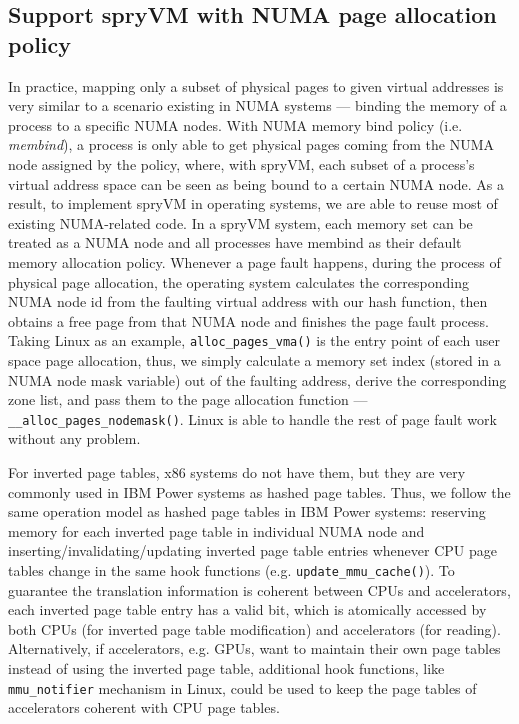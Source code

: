 \subsection{Support spryVM with NUMA page allocation policy}
In practice,  mapping only a subset of physical pages to given virtual addresses is very similar to a scenario existing in NUMA systems — binding the memory of a process to a specific NUMA nodes. With NUMA memory bind policy (i.e. \textit{membind}), a process is only able to get physical pages coming from the NUMA node assigned by the policy, where, with spryVM, each subset of a process’s virtual address space can be seen as being bound to a certain NUMA node. As a result, to implement spryVM in operating systems, we are able to reuse most of existing NUMA-related code. In a spryVM system, each memory set can be treated as a NUMA node and all processes have membind as their default memory allocation policy. Whenever a page fault happens, during the process of physical page allocation, the operating system calculates the corresponding NUMA node id from the faulting virtual address with our hash function, then obtains a free page from that NUMA node and finishes the page fault process. Taking Linux as an example, \verb|alloc_pages_vma()| is the entry point of each user space  page allocation, thus, we simply calculate a memory set index (stored in a NUMA node mask variable) out of the faulting address, derive the corresponding zone list, and pass them to the page allocation function — \verb|__alloc_pages_nodemask()|. Linux is able to handle the rest of page fault work without any problem.

For inverted page tables, x86 systems do not have them, but they are very commonly used in IBM Power systems as hashed page tables. Thus, we follow the same operation model as hashed page tables in IBM Power systems: reserving memory for each inverted page table in individual NUMA node and inserting/invalidating/updating inverted page table entries whenever CPU page tables change in the same hook functions (e.g. \verb|update_mmu_cache()|). To guarantee the translation information is coherent between CPUs and accelerators, each inverted page table entry has a valid bit, which is atomically accessed by both CPUs (for inverted page table modification) and accelerators (for reading). Alternatively, if accelerators, e.g. GPUs, want to maintain their own page tables instead of using the inverted page table, additional hook functions, like  \verb|mmu_notifier| mechanism in Linux, could be used to keep the page tables of accelerators coherent with CPU page tables.

